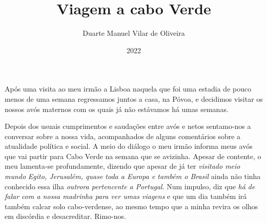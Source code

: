 \documentclass{article}
\title{Viagem a cabo Verde}
\author{Duarte Manuel Vilar de Oliveira }
\date{2022}
\begin{document}
\maketitle

Após uma visita ao meu irmão a Lisboa \- naquela que foi uma estadia de pouco menos de uma semana regressamos juntos a casa, na Póvoa, e decidimos visitar os nossos avós maternos com os quais já não estávamos há umas semanas.
 
Depois dos usuais cumprimentos e saudações entre avós e netos sentamo-nos a conversar sobre a nossa vida, acompanhados de alguns comentários sobre a atualidade política e social.
A meio do diálogo o meu irmão informa meus avós que vai partir para Cabo Verde na semana que se avizinha.
Apesar de contente, o meu lamenta-se profundamente, dizendo que apesar de já ter \textit{visitado meio mundo} \- \textit{Egito, Jerusalém, quase toda a Europa e também o Brasil} \- ainda não tinha conhecido essa ilha \textit{outrora pertencente a Portugal}.
Num impulso, diz que \textit{há de falar com a nossa madrinha para ver umas viagens} e que um dia também irá também calcar solo cabo-verdense, ao mesmo tempo que a minha  revira os olhos em discórdia e desacreditar. Rimo-nos.

\printindex
\end{document}
